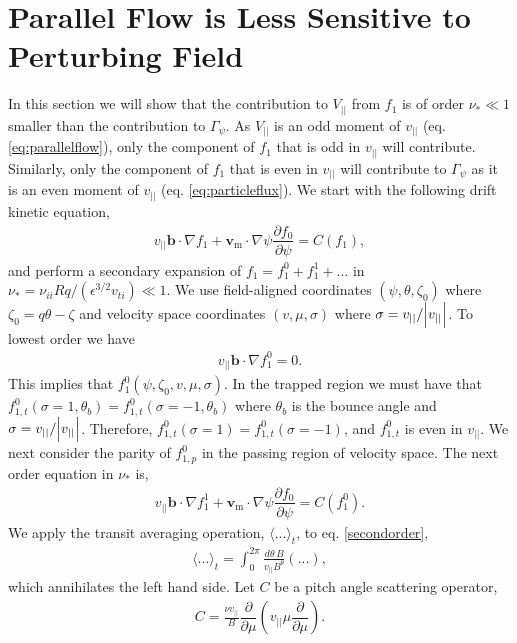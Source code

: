 \documentclass[aip, pop, preprint]{revtex4-1}
\numberwithin{figure}{section}
\numberwithin{equation}{section}
\newcommand{\partder}[2]{\dfrac{\partial  #1}{\partial  #2}} %
\begin{document}
\section{Parallel Flow is Less Sensitive to Perturbing Field} \label{parallelflow}
In this section we will show that the contribution to $V_{||}$ from $f_1$ is of order $\nu_* \ll 1$ smaller than the contribution to $\Gamma_{\psi}$. As $V_{||}$ is an odd moment of $v_{||}$ (eq. \ref{eq:parallelflow}), only the component of $f_1$ that is odd in $v_{||}$ will contribute. Similarly, only the component of $f_1$ that is even in $v_{||}$ will contribute to $\Gamma_{\psi}$ as it is an even moment of $v_{||}$ (eq. \ref{eq:particleflux}). We start with the following drift kinetic equation,
\begin{gather}
v_{||} \bm{b} \cdot \nabla f_1 + \bm{v}_{\text{m}} \cdot \nabla \psi \partder{f_0}{\psi} = C(f_1),
\end{gather}
and perform a secondary expansion of $f_1 = f_1^0 + f_1^1 + ...$ in $\nu_* = \nu_{ii} Rq/(\epsilon^{3/2} v_{ti}) \ll 1$. We use field-aligned coordinates $(\psi, \theta, \zeta_0)$ where $\zeta_0 = q \theta - \zeta$ and velocity space coordinates $(v, \mu, \sigma)$ where $\sigma = v_{||}/\abs{v_{||}}$. To lowest order we have
\begin{gather}
v_{||} \bm{b} \cdot \nabla f_1^0 = 0.
\end{gather}
\label{firstorder}
This implies that $f_1^0(\psi, \zeta_0, v, \mu, \sigma)$. In the trapped region we must have that $f_{1,t}^0(\sigma = 1, \theta_b) = f_{1,t}^0(\sigma = -1, \theta_b)$ where $\theta_b$ is the bounce angle and $\sigma = v_{||}/\abs{v_{||}}$. Therefore, $f_{1,t}^0(\sigma = 1) = f_{1,t}^0(\sigma = -1)$, and $f_{1,t}^0$ is even in $v_{||}$. We next consider the parity of $f_{1,p}^0$ in the passing region of velocity space. The next order equation in $\nu_*$ is,
\begin{gather}
v_{||} \bm{b} \cdot \nabla f_1^1 + \bm{v}_{\text{m}} \cdot \nabla \psi \partder{f_0}{\psi} = C(f_1^0).
\label{secondorder}
\end{gather}
We apply the transit averaging operation, $\langle ... \rangle_t$, to eq. \ref{secondorder},
\begin{gather}
\langle ... \rangle_t = \int_0^{2\pi} \frac{d \theta \, B}{v_{||} B^{\theta}} (...),
\end{gather}
which annihilates the left hand side. Let $C$ be a pitch angle scattering operator,
\begin{gather}
C = \frac{\nu v_{||}}{B} \partder{}{\mu} \left( v_{||} \mu \partder{}{\mu} \right).
\end{gather}
\end{document}
